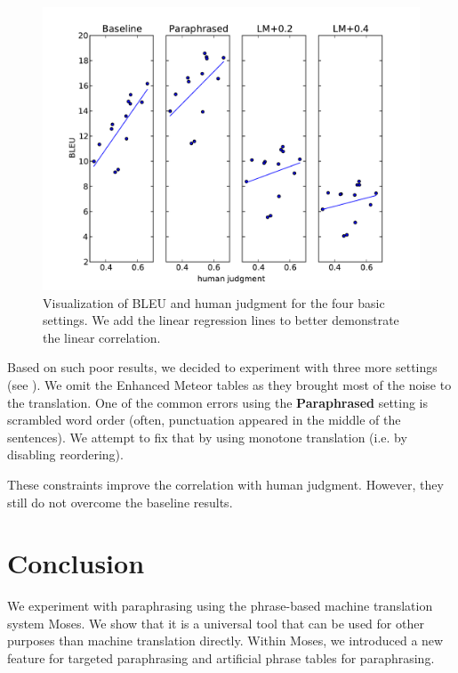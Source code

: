 \begin{figure}[htb]
\begin{center}
\includegraphics[scale=0.6]{../img/moses_multigraf.pdf}
\caption{Visualization of BLEU and human judgment for the four basic settings. 
We add the linear regression lines to better demonstrate the linear correlation.}
\label{visualization}
\end{center}
\end{figure}
 
Based on such poor results, we decided to experiment with three more settings 
(see ). We omit the Enhanced Meteor tables as they brought
most of the noise to the translation. One of the common errors using the 
\textbf{Paraphrased} setting is scrambled word order (often, punctuation
appeared in the middle of the sentences).
We attempt to fix that by using monotone translation (i.e. by disabling reordering).

These constraints improve the correlation with human judgment. However, they still
do not overcome the baseline results.

\section{Conclusion}
We experiment with paraphrasing using the phrase-based machine translation system 
Moses. We show that it is a universal tool that can be used for other purposes than
machine translation directly. Within Moses, we introduced a new feature for targeted 
paraphrasing and artificial phrase tables for paraphrasing. 

